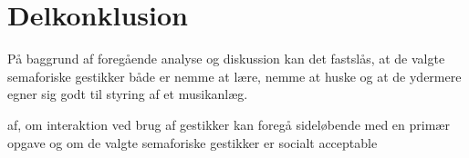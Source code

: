 \section{Delkonklusion}
\label{SocialAcceptDelkonklusion}
%
På baggrund af foregående analyse og diskussion kan det fastslås, at de valgte semaforiske gestikker både er nemme at lære, nemme at huske og at de ydermere egner sig godt til styring af et musikanlæg. 

af, om interaktion ved brug af gestikker kan foregå sideløbende med en primær opgave og om de valgte semaforiske gestikker er socialt acceptable